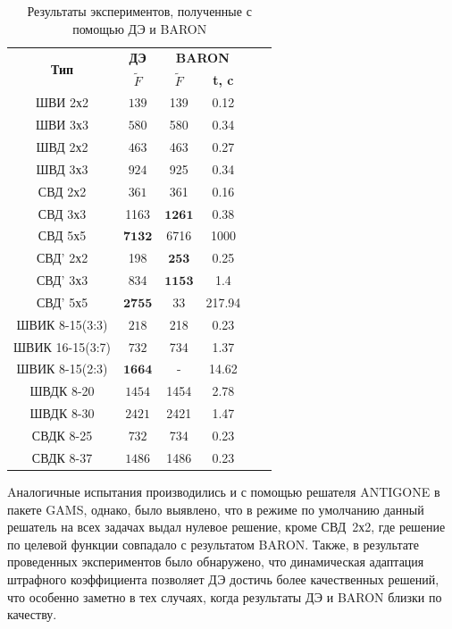 \documentclass{llncs}
\begin{document}
\begin{table}[!h]

\centering
\caption{ Результаты экспериментов, полученные с помощью ДЭ и BARON}
\begin{tabular}{|c|c|c c|c c|}
    \hline
    \multirow{2}{*}{\textbf{Тип}} & \textbf{ДЭ} & \multicolumn{2}{|c|}{\textbf{BARON}} \\
    & \textbf{$\tilde{F}$} & \textbf{$\tilde{F}$} & \textbf{t, c}  \\
    \hline
    ШВИ 2х2         & ${139}$   & 139    & 0.12      \\
    ШВИ 3х3         & ${580}$   & 580    & 0.34       \\
    ШВД 2х2         & ${463}$   & 463    & 0.27     \\
    ШВД 3х3         & ${924}$   & 925    & 0.34        \\
    СВД 2х2         & ${361}$   & 361    & 0.16         \\
    СВД 3х3        & 1163  & $\mathbf{1261}$   & 0.38     \\
    СВД 5х5         & $\mathbf{7132}$  & 6716   & 1000   \\
    СВД' 2х2       & 198   & $\mathbf{253}$    & 0.25         \\
    СВД' 3х3       & 834   & $\mathbf{1153}$   & 1.4          \\
    СВД' 5х5        & $\mathbf{2755}$  & 33     & 217.94     \\
    ШВИК 8-15(3:3)  & ${218}$   & 218    & 0.23       \\
    ШВИК 16-15(3:7) & ${732}$   & 734    & 1.37     \\
    ШВИК 8-15(2:3)  & $\mathbf{1664}$     & -   & 14.62     \\
    ШВДК 8-20       & ${1454}$  & 1454   & 2.78       \\
    ШВДК 8-30       & ${2421}$  & 2421   & 1.47     \\
    СВДК 8-25       & ${732}$   & 734    & 0.23        \\
    СВДК 8-37       & ${1486}$  & 1486   & 0.23      \\
    \hline
\end{tabular}
\label{tab:results_de}
\end{table}

Aналогичные испытания производились и с помощью решателя ANTIGONE в пакете GAMS, однако, было выявлено, что в режиме по умолчанию данный решатель на всех задачах выдал нулевое решение, кроме СВД~2х2, где решение по целевой функции совпадало с результатом BARON.
Также, в результате проведенных экспериментов было обнаружено, что динамическая адаптация штрафного коэффициента позволяет ДЭ достичь более качественных решений, что особенно заметно в тех случаях, когда результаты ДЭ и BARON близки по качеству.
\end{document}
